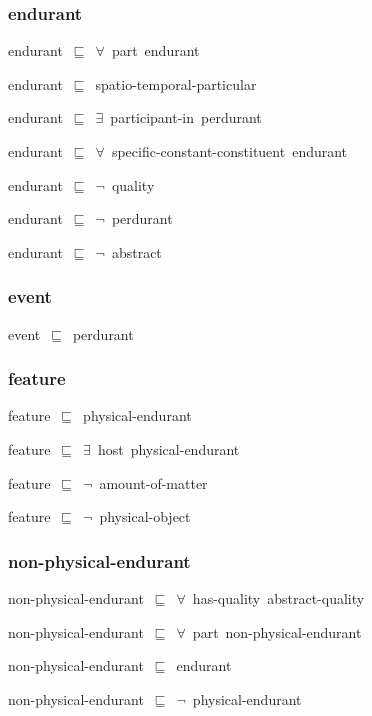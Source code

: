 \documentclass{article}
\begin{document}
\subsubsection*{endurant}

endurant~\ensuremath{\sqsubseteq}~\ensuremath{\forall}~part~endurant~

endurant~\ensuremath{\sqsubseteq}~spatio-temporal-particular~

endurant~\ensuremath{\sqsubseteq}~\ensuremath{\exists}~participant-in~perdurant~

endurant~\ensuremath{\sqsubseteq}~\ensuremath{\forall}~specific-constant-constituent~endurant~

endurant~\ensuremath{\sqsubseteq}~\ensuremath{\lnot}~quality

endurant~\ensuremath{\sqsubseteq}~\ensuremath{\lnot}~perdurant

endurant~\ensuremath{\sqsubseteq}~\ensuremath{\lnot}~abstract

\subsubsection*{event}

event~\ensuremath{\sqsubseteq}~perdurant~

\subsubsection*{feature}

feature~\ensuremath{\sqsubseteq}~physical-endurant~

feature~\ensuremath{\sqsubseteq}~\ensuremath{\exists}~host~physical-endurant~

feature~\ensuremath{\sqsubseteq}~\ensuremath{\lnot}~amount-of-matter

feature~\ensuremath{\sqsubseteq}~\ensuremath{\lnot}~physical-object

\subsubsection*{non-physical-endurant}

non-physical-endurant~\ensuremath{\sqsubseteq}~\ensuremath{\forall}~has-quality~abstract-quality~

non-physical-endurant~\ensuremath{\sqsubseteq}~\ensuremath{\forall}~part~non-physical-endurant~

non-physical-endurant~\ensuremath{\sqsubseteq}~endurant~

non-physical-endurant~\ensuremath{\sqsubseteq}~\ensuremath{\lnot}~physical-endurant
\end{document}
